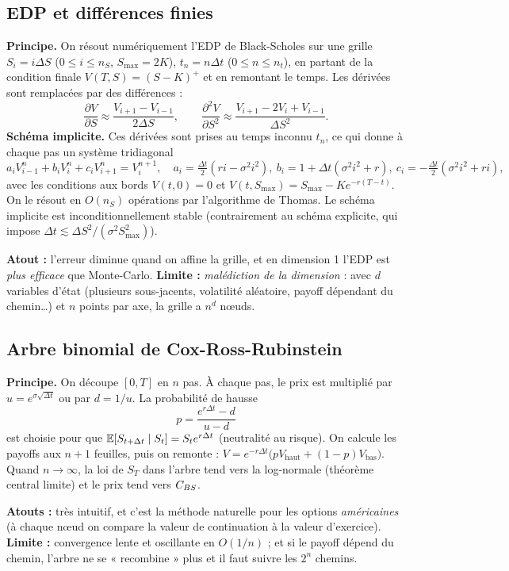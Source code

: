 \subsection{EDP et différences finies}
\textbf{Principe.} On résout numériquement l'EDP de Black-Scholes sur une grille $S_i = i\Delta S$ ($0\le i\le n_S$, $S_{\max} = 2K$), $t_n = n\Delta t$ ($0\le n\le n_t$), en partant de la condition finale $V(T,S) = (S-K)^+$ et en remontant le temps. Les dérivées sont remplacées par des différences :
\[
\frac{\partial V}{\partial S}\approx\frac{V_{i+1}-V_{i-1}}{2\Delta S},\qquad \frac{\partial^2V}{\partial S^2}\approx\frac{V_{i+1}-2V_i+V_{i-1}}{\Delta S^2}.
\]
\textbf{Schéma implicite.} Ces dérivées sont prises au temps inconnu $t_n$, ce qui donne à chaque pas un système tridiagonal
\[
a_iV^n_{i-1} + b_iV^n_i + c_iV^n_{i+1} = V^{n+1}_i,\quad a_i = \tfrac{\Delta t}{2}(ri - \sigma^2i^2),\ b_i = 1+\Delta t(\sigma^2i^2+r),\ c_i = -\tfrac{\Delta t}{2}(\sigma^2i^2+ri),
\]
avec les conditions aux bords $V(t,0)=0$ et $V(t,S_{\max}) = S_{\max}-Ke^{-r(T-t)}$. On le résout en $O(n_S)$ opérations par l'algorithme de Thomas. Le schéma implicite est inconditionnellement stable (contrairement au schéma explicite, qui impose $\Delta t \lesssim \Delta S^2/(\sigma^2S_{\max}^2)$).


\textbf{Atout :} l'erreur diminue quand on affine la grille, et en dimension 1 l'EDP est \emph{plus efficace} que Monte-Carlo.
\textbf{Limite :} \emph{malédiction de la dimension} : avec $d$ variables d'état (plusieurs sous-jacents, volatilité aléatoire, payoff dépendant du chemin\dots) et $n$ points par axe, la grille a $n^d$ nœuds.

\subsection{Arbre binomial de Cox-Ross-Rubinstein}
\textbf{Principe.} On découpe $[0,T]$ en $n$ pas. À chaque pas, le prix est multiplié par $u = e^{\sigma\sqrt{\Delta t}}$ ou par $d = 1/u$. La probabilité de hausse
\[
p = \frac{e^{r\Delta t}-d}{u-d}
\]
est choisie pour que $\mathbb{E}[S_{t+\Delta t}\mid S_t] = S_te^{r\Delta t}$ (neutralité au risque). On calcule les payoffs aux $n+1$ feuilles, puis on remonte : $V = e^{-r\Delta t}\big(pV_{\text{haut}}+(1-p)V_{\text{bas}}\big)$. Quand $n\to\infty$, la loi de $S_T$ dans l'arbre tend vers la log-normale (théorème central limite) et le prix tend vers $C_{BS}$.


\textbf{Atouts :} très intuitif, et c'est la méthode naturelle pour les options \emph{américaines} (à chaque nœud on compare la valeur de continuation à la valeur d'exercice).
\textbf{Limite :} convergence lente et oscillante en $O(1/n)$ ; et si le payoff dépend du chemin, l'arbre ne se « recombine » plus et il faut suivre les $2^n$ chemins.

